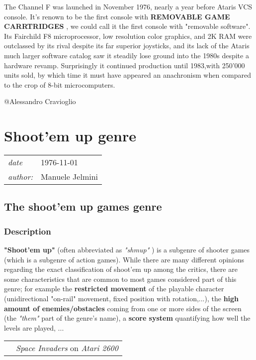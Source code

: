 \documentclass[a4paper,10pt]{book}
\newcommand{\pageHeader}[4]{
    \section{#1}
    \vspace{-0.3cm}
    \begin{table}[h!]
     \begin{tabular}{ll}
        \hline
        \textit{date} & #2 \\
        \textit{author: } & #3\\
        \hline
     \end{tabular}
    \end{table}
    \vspace{-0.3cm}
}
\begin{document}
          The Channel F was launched in November 1976, nearly a year before Ataris VCS console.
           It's renown to be the first console with  \textbf{REMOVABLE GAME CARRTRIDGES } , we could call it the first console with "removable software".
           Its Fairchild F8 microprocessor, low resolution color graphics, and 2K RAM were outclassed by its rival despite its
           far superior joysticks, and its lack of the Ataris much larger software catalog saw it steadily lose ground into the
           1980s despite a hardware revamp. Surprisingly it continued production until 1983,with 250'000 units sold, by which time it must have
           appeared an anachronism when compared to the crop of 8-bit microcomputers. 
 
 @Alessandro Cravioglio 
 
 \newpage\pageHeader{Shoot'em up genre}{1976-11-01}{Manuele Jelmini}{A look at the most important genre of the second generation}
 \subsection{The shoot'em up games genre }
 
 \subsubsection{Description }
 
 
 \textbf{"Shoot'em up" }  (often abbreviated as  \textit{"shmup" }) is a subgenre of shooter games (which is a subgenre of action games).
           While there are many different opinions regarding the exact classification of shoot'em up among the critics, there are some characteristics that are common to most games considered part of this genre;
           for example the  \textbf{restricted movement }  of the playable character (unidirectional "on-rail" movement, fixed position with rotation,...),
           the  \textbf{high amount of enemies/obstacles }  coming from one or more sides of the screen (the  \textit{"them" } part of the genre's name), a  \textbf{score system }  quantifying how well the levels are played, ...  
 
 \begin{longtable}{p{1mm}|l|}\hline
 
 & 
 \\\hline
 
 & \textit{Space Invaders } on  \textit{Atari 2600 }
 \\\hline
 \end{longtable}
 
\end{document}
